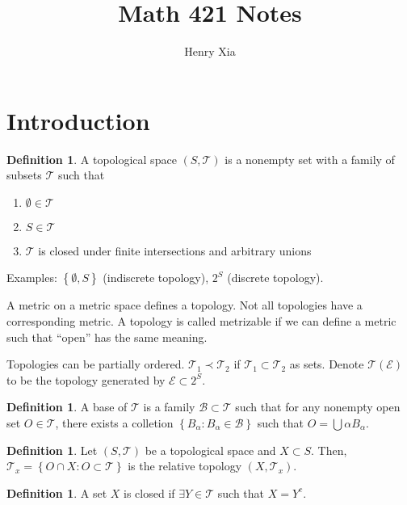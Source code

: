 \documentclass[11pt]{article}
\title{Math 421 Notes}
\author{Henry Xia}
\theoremstyle{definition}
\newtheorem{defn}[thm]{Definition}
\newcommand{\set}[1]{\left\{ #1 \right\}}
\newcommand{\m}[1]{\mathcal{#1}}
\begin{document}
\maketitle

\tableofcontents


\section{Introduction}

\begin{defn} A topological space $(S,\m{T})$ is a nonempty set with a family of subsets
$\m{T}$ such that
\begin{enumerate}
  \item $\emptyset\in\m{T}$
  \item $S\in\m{T}$
  \item $\m{T}$ is closed under finite intersections and arbitrary unions
\end{enumerate}
\end{defn}

Examples: $\set{\emptyset,S}$ (indiscrete topology), $2^S$ (discrete topology).

A metric on a metric space defines a topology. Not all topologies have a corresponding
metric. A topology is called metrizable if we can define a metric such that ``open'' has
the same meaning.

Topologies can be partially ordered. $\m{T}_1\prec\m{T}_2$ if $\m{T}_1\subset\m{T}_2$ as
sets. Denote $\m{T}(\m{E})$ to be the topology generated by $\m{E}\subset 2^S$.

\begin{defn}
A base of $\m{T}$ is a family $\m{B}\subset\m{T}$ such that for any nonempty open set
$O\in\m{T}$, there exists a colletion $\set{B_\alpha:B_\alpha\in\m{B}}$ such that
$O=\bigcup\alpha B_\alpha$.
\end{defn}

\begin{defn}
Let $(S,\m{T})$ be a topological space and $X\subset S$. Then, $\m{T}_x=\set{O\cap X:
O\subset\m{T}}$ is the relative topology $(X,\m{T}_x)$.
\end{defn}

\begin{defn}
A set $X$ is closed if $\exists Y\in\m{T}$ such that $X=Y^c$.
\end{defn}
\end{document}
